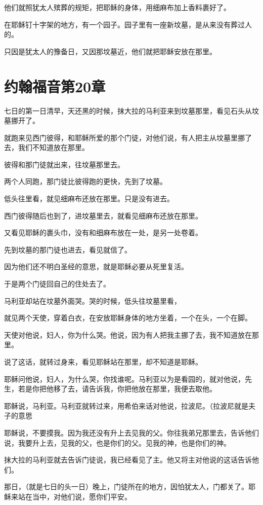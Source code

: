 \documentclass[12pt,oneside]{book}
\begin{document}
他们就照犹太人殡葬的规矩，把耶稣的身体，用细麻布加上香料裹好了。

在耶稣钉十字架的地方，有一个园子。园子里有一座新坟墓，是从来没有葬过人的。

只因是犹太人的豫备日，又因那坟墓近，他们就把耶稣安放在那里。

\chapter{约翰福音第20章}
七日的第一日清早，天还黑的时候，抹大拉的马利亚来到坟墓那里，看见石头从坟墓挪开了。

就跑来见西门彼得，和耶稣所爱的那个门徒，对他们说，有人把主从坟墓里挪了去，我们不知道放在那里。

彼得和那门徒就出来，往坟墓那里去。

两个人同跑，那门徒比彼得跑的更快，先到了坟墓。

低头往里看，就见细麻布还放在那里。只是没有进去。

西门彼得随后也到了，进坟墓里去，就看见细麻布还放在那里。

又看见耶稣的裹头巾，没有和细麻布放在一处，是另一处卷着。

先到坟墓的那门徒也进去，看见就信了。

因为他们还不明白圣经的意思，就是耶稣必要从死里复活。

于是两个门徒回自己的住处去了。

马利亚却站在坟墓外面哭。哭的时候，低头往坟墓里看，

就见两个天使，穿着白衣，在安放耶稣身体的地方坐着，一个在头，一个在脚。

天使对他说，妇人，你为什么哭。他说，因为有人把我主挪了去，我不知道放在那里。

说了这话，就转过身来，看见耶稣站在那里，却不知道是耶稣。

耶稣问他说，妇人，为什么哭，你找谁呢。马利亚以为是看园的，就对他说，先生，若是你把他移了去，请告诉我，你把他放在那里，我便去取他。

耶稣说，马利亚。马利亚就转过来，用希伯来话对他说，拉波尼。（拉波尼就是夫子的意思

耶稣说，不要摸我。因为我还没有升上去见我的父。你往我弟兄那里去，告诉他们说，我要升上去，见我的父，也是你们的父。见我的神，也是你们的神。

抹大拉的马利亚就去告诉门徒说，我已经看见了主。他又将主对他说的这话告诉他们。

那日，（就是七日的头一日）晚上，门徒所在的地方，因怕犹太人，门都关了。耶稣来站在当中，对他们说，愿你们平安。
\end{document}
